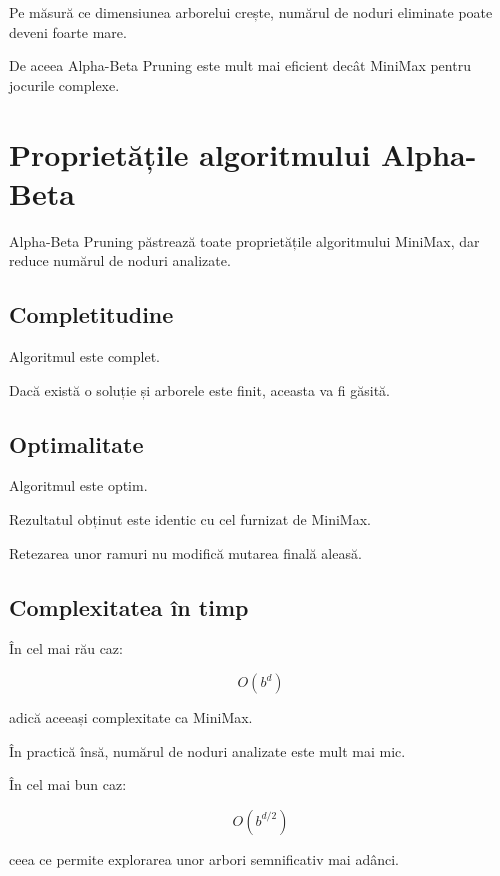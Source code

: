 \documentclass[12pt,a4paper]{article}
\begin{document}
Pe măsură ce dimensiunea arborelui crește, numărul de noduri eliminate poate deveni foarte mare.

De aceea Alpha-Beta Pruning este mult mai eficient decât MiniMax pentru jocurile complexe.

















\section{Proprietățile algoritmului Alpha-Beta}

Alpha-Beta Pruning păstrează toate proprietățile algoritmului MiniMax, dar reduce numărul de noduri analizate.

\subsection{Completitudine}

Algoritmul este complet.

Dacă există o soluție și arborele este finit, aceasta va fi găsită.

\subsection{Optimalitate}

Algoritmul este optim.

Rezultatul obținut este identic cu cel furnizat de MiniMax.

Retezarea unor ramuri nu modifică mutarea finală aleasă.

\subsection{Complexitatea în timp}

În cel mai rău caz:

\[
O(b^d)
\]

adică aceeași complexitate ca MiniMax.

În practică însă, numărul de noduri analizate este mult mai mic.

În cel mai bun caz:

\[
O(b^{d/2})
\]

ceea ce permite explorarea unor arbori semnificativ mai adânci.
\end{document}

